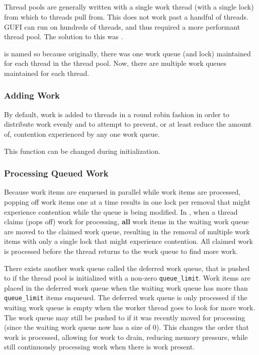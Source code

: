 \subsection{\qptp}
Thread pools are generally written with a single work thread (with a
single lock) from which to threads pull from. This does not work past
a handful of threads. GUFI can run on hundreds of threads, and thus
required a more performant thread pool. The solution to this was
\qptp.

\qptp is named so because originally, there was one work queue (and
lock) maintained for each thread in the thread pool. Now, there are
multiple work queues maintained for each thread.

\subsubsection{Adding Work}
By default, work is added to threads in a round robin fashion in order
to distribute work evenly and to attempt to prevent, or at least
reduce the amount of, contention experienced by any one work queue.

This function can be changed during initialization.

\subsubsection{Processing Queued Work}
Because work items are enqueued in parallel while work items are
processed, popping off work items one at a time results in one lock
per removal that might experience contention while the queue is being
modified. In \qptp, when a thread claims (pops off) work for
processing, {\bf all} work items in the waiting work queue are moved
to the claimed work queue, resulting in the removal of multiple work
items with only a single lock that might experience contention. All
claimed work is processed before the thread returns to the work queue
to find more work.

There exists another work queue called the deferred work queue, that
is pushed to if the thread pool is initialized with a non-zero
\texttt{queue\_limit}. Work items are placed in the deferred work
queue when the waiting work queue has more than \texttt{queue\_limit}
items enqueued. The deferred work queue is only processed if the
waiting work queue is empty when the worker thread goes to look for
more work. The work queue may still be pushed to if it was recently
moved for processing (since the waiting work queue now has a size of
0). This changes the order that work is processed, allowing for work
to drain, reducing memory pressure, while still continuously
processing work when there is work present.

